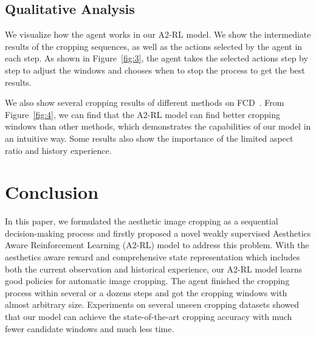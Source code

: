 \documentclass[10pt,twocolumn,letterpaper]{article}
\begin{document}
\begin{figure*}[ht]
\begin{center}
{}
\end{center}
\caption{Image cropping examples on FCD~\cite{chen2017quantitative}. The number in the upper left corner is the difference between the aesthetic scores of the cropped and original image, which is $s_{aes}(I_{crop})-s_{aes}(I_{original})$. The aesthetic score $s_{aes}(I)$ is used in the definition of the reward function (see Section~\ref{reward}). Best viewed in color.}
\label{fig:4}
\end{figure*}

\subsection{Qualitative Analysis}
We visualize how the agent works in our A2-RL model. We show the intermediate results of the cropping sequences, as well as the actions selected by the agent in each step. As shown in Figure~\ref{fig:3}, the agent takes the selected actions step by step to adjust the windows and chooses when to stop the process to get the best results.

We also show several cropping results of different methods on FCD~\cite{chen2017quantitative}. From Figure~\ref{fig:4}, we can find that the A2-RL model can find better cropping windows than other methods, which demonstrates the capabilities of our model in an intuitive way. Some results also show the importance of the limited aspect ratio and history experience.
\section{Conclusion}
In this paper, we formulated the aesthetic image cropping as a sequential decision-making process and firstly proposed a novel weakly supervised Aesthetics Aware Reinforcement Learning (A2-RL) model to address this problem. With the aesthetics aware reward and comprehensive state representation which includes both the current observation and historical experience, our A2-RL model learns good policies for automatic image cropping. The agent finished the cropping process within several or a dozens steps and got the cropping windows with almost arbitrary size. Experiments on several unseen cropping datasets showed that our model can achieve the state-of-the-art cropping accuracy with much fewer candidate windows and much less time.
\end{document}
